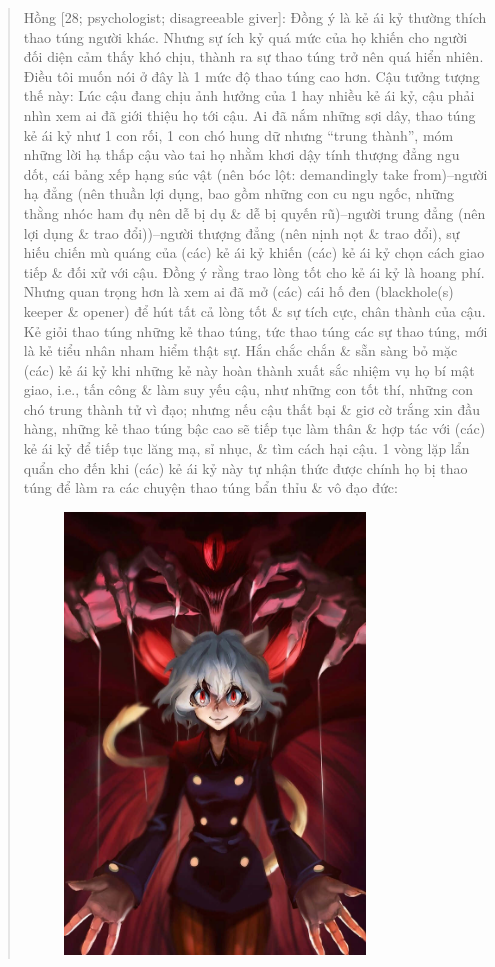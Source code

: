 \documentclass[12pt,oneside]{book}
\begin{document}
\begin{quote}
	{\sf Hồng [28; psychologist; disagreeable giver]:} Đồng ý là kẻ ái kỷ thường thích thao túng người khác. Nhưng sự ích kỷ quá mức của họ khiến cho người đối diện cảm thấy khó chịu, thành ra sự thao túng trở nên quá hiển nhiên. Điều tôi muốn nói ở đây là 1 mức độ thao túng cao hơn. Cậu tưởng tượng thế này: Lúc cậu đang chịu ảnh hưởng của 1 hay nhiều kẻ ái kỷ, cậu phải nhìn xem ai đã giới thiệu họ tới cậu. Ai đã nắm những sợi dây, thao túng kẻ ái kỷ như 1 con rối, 1 con chó hung dữ nhưng ``trung thành'', móm những lời hạ thấp cậu vào tai họ nhằm khơi dậy tính thượng đẳng ngu dốt, cái bảng xếp hạng súc vật (nên bóc lột: demandingly take from)--người hạ đẳng (nên thuần lợi dụng, bao gồm những con cu ngu ngốc, những thằng nhóc ham đụ nên dễ bị dụ \& dễ bị quyến rũ)--người trung đẳng (nên lợi dụng \& trao đổi))--người thượng đẳng (nên nịnh nọt \& trao đổi), sự hiếu chiến mù quáng của (các) kẻ ái kỷ khiến (các) kẻ ái kỷ chọn cách giao tiếp \& đối xử với cậu. Đồng ý rằng trao lòng tốt cho kẻ ái kỷ là hoang phí. Nhưng quan trọng hơn là xem ai đã mở (các) cái hố đen (blackhole(s) keeper \& opener) để hút tất cả lòng tốt \& sự tích cực, chân thành của cậu. Kẻ giỏi thao túng những kẻ thao túng, tức thao túng các sự thao túng, mới là kẻ tiểu nhân nham hiểm thật sự. Hắn chắc chắn \& sẵn sàng bỏ mặc (các) kẻ ái kỷ khi những kẻ này hoàn thành xuất sắc nhiệm vụ họ bí mật giao, i.e., tấn công \& làm suy yếu cậu, như những con tốt thí, những con chó trung thành tử vì đạo; nhưng nếu cậu thất bại \& giơ cờ trắng xin đầu hàng, những kẻ thao túng bậc cao sẽ tiếp tục làm thân \& hợp tác với (các) kẻ ái kỷ để tiếp tục lăng mạ, sỉ nhục, \& tìm cách hại cậu. 1 vòng lặp lẩn quẩn cho đến khi (các) kẻ ái kỷ này tự nhận thức được chính họ bị thao túng để làm ra các chuyện thao túng bẩn thỉu \& vô đạo đức:
	\begin{figure}[H]
		\centering
		\includegraphics[width = 8cm]{Neferpitou}

\end{figure}
\end{quote}
\end{document}
